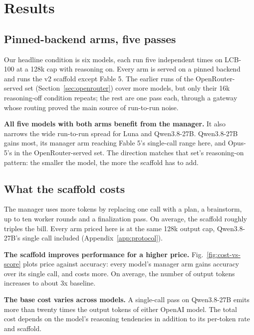 \documentclass{article}
\begin{document}
\section{Results}
\label{sec:results}

\subsection{Pinned-backend arms, five passes}
\label{sec:pinned}





Our headline condition is six models, each run five independent times on LCB-100 at a 128k
cap with reasoning on. Every arm is served on a pinned backend and runs the v2 scaffold except Fable 5. The
earlier runs of the OpenRouter-served set (Section~\ref{sec:openrouter}) cover more models,
but only their 16k reasoning-off condition repeats; the rest are one pass each, through a
gateway whose routing proved the main source of run-to-run noise.

\textbf{All five models with both arms benefit from the manager.} It also narrows
the wide run-to-run spread for Luna and Qwen3.8-27B. Qwen3.8-27B gains most, its manager arm
reaching Fable 5's single-call range here, and Opus-5's in the OpenRouter-served set. The
direction matches that set's reasoning-on pattern: the smaller the model, the more the
scaffold has to add.

\subsection{What the scaffold costs} 
\label{sec:cost}

The manager uses more tokens by replacing one call
with a plan, a brainstorm, up to ten worker rounds and a finalization pass. On average, the scaffold roughly triples the bill. Every arm
priced here is at the same 128k output cap, Qwen3.8-27B's single call included
(Appendix~\ref{app:protocol}).





\textbf{The scaffold improves performance for a higher price.}
Fig.~\ref{fig:cost-vs-score} plots price against accuracy: every model's manager arm gains accuracy over its single
call, and costs more. On average, the number of output tokens increases to about 3x baseline.
 
\textbf{The base cost varies across models.} A single-call pass on Qwen3.8-27B emits more
than twenty times the output tokens of either OpenAI model. The total cost depends on the model's reasoning tendencies in addition to its per-token rate and scaffold.
\end{document}
